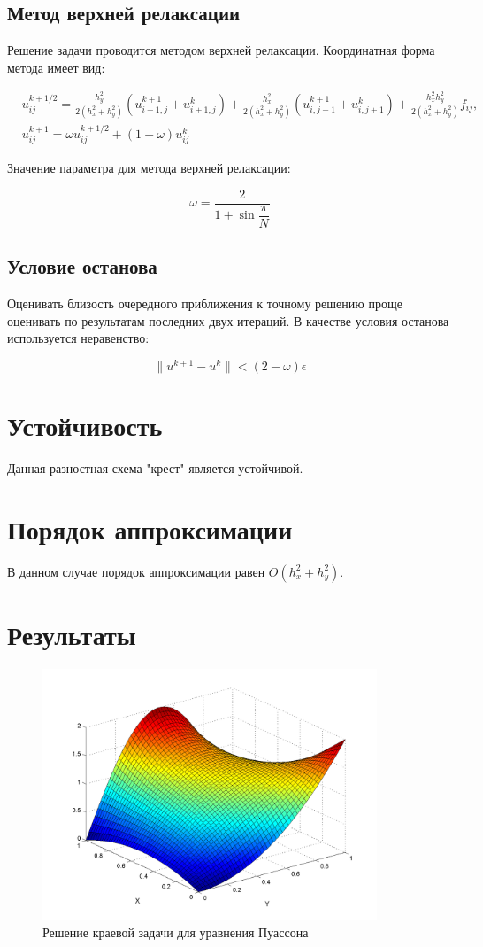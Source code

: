 \documentclass[a4paper,12pt]{article}
\begin{document}
\subsection{Метод верхней релаксации}
Решение задачи проводится методом верхней релаксации. Координатная форма метода имеет вид:


\begin{align*}
&u_{ij}^{k+1/2} = \frac{h_y^2}{2(h_x^2 + h_y^2)}(u_{i-1,j}^{k+1} + u_{i+1,j}^k) + 
	  							\frac{h_x^2}{2(h_x^2 + h_y^2)}(u_{i,j-1}^{k+1} + u_{i,j+1}^k) +
								  \frac{h_x^2 h_y^2}{2(h_x^2 + h_y^2)} f_{ij}, \\
&u_{ij}^{k+1} = \omega u_{ij}^{k+1/2} + (1-\omega)u_{ij}^k
\end{align*}

Значение параметра для метода верхней релаксации:

$$
\omega = \frac{2}{1+\sin\dfrac{\pi}{N}}
$$

\subsection{Условие останова}

Оценивать близость очередного приближения к точному решению проще оценивать по результатам последних двух итераций. В качестве условия останова используется неравенство:

$$
\|u^{k+1} - u^k\| < (2-\omega)\epsilon
$$

\section{Устойчивость}

Данная разностная схема "крест" является устойчивой. 

\section{Порядок аппроксимации}

В данном случае порядок аппроксимации равен $O(h_x^2 + h_y^2)$.
\newpage
\section{Результаты}

\begin{figure}[h]
\centering
\includegraphics[width = 10cm]{screen.png}
\caption{Решение краевой задачи для уравнения Пуассона}
\label{fig:1}	
\end{figure}
\end{document}

